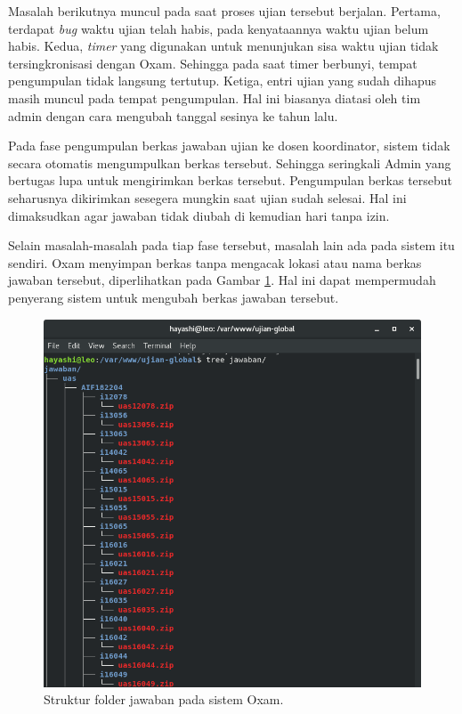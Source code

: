 Masalah berikutnya muncul pada saat proses ujian tersebut berjalan. Pertama,
terdapat \textit{bug} waktu ujian telah habis, pada kenyataannya waktu ujian
belum habis. Kedua, \textit{timer} yang digunakan untuk menunjukan sisa waktu
ujian tidak tersingkronisasi dengan Oxam. Sehingga pada saat timer berbunyi,
tempat pengumpulan tidak langsung tertutup. Ketiga, entri ujian yang sudah
dihapus masih muncul pada tempat pengumpulan. Hal ini biasanya diatasi oleh tim
admin dengan cara mengubah tanggal sesinya ke tahun lalu.

Pada fase pengumpulan berkas jawaban ujian ke dosen koordinator, sistem tidak
secara otomatis mengumpulkan berkas tersebut. Sehingga seringkali Admin yang
bertugas lupa untuk mengirimkan berkas tersebut. Pengumpulan berkas tersebut
seharusnya dikirimkan sesegera mungkin saat ujian sudah selesai. Hal ini
dimaksudkan agar jawaban tidak diubah di kemudian hari tanpa izin.

Selain masalah-masalah pada tiap fase tersebut, masalah lain ada pada sistem itu
sendiri. Oxam menyimpan berkas tanpa mengacak lokasi atau nama berkas jawaban
tersebut, diperlihatkan pada Gambar \ref{fig:ss-folder-jawaban}. Hal ini dapat
mempermudah penyerang sistem untuk mengubah berkas jawaban tersebut.

\begin{figure}
    \centering
    \includegraphics[width=0.6\paperwidth]{Gambar/ss-struktur-folder-jawaban.png}
    \caption{Struktur folder jawaban pada sistem Oxam.}
    \label{fig:ss-folder-jawaban}
\end{figure}

